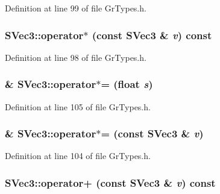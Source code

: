 Definition at line 99 of file GrTypes.h.\hypertarget{struct_s_vec3_0366aeb56a82c9455af3c1da0001c861}{
\subsubsection[{operator$\ast$}]{ SVec3::operator$\ast$ (const {\bf SVec3} \& {\em v}) const}}
\label{struct_s_vec3_0366aeb56a82c9455af3c1da0001c861}




Definition at line 98 of file GrTypes.h.\hypertarget{struct_s_vec3_eb70adcdab8bd8aa9351db18341ef6e0}{
\subsubsection[{operator$\ast$=}]{\& SVec3::operator$\ast$= (float {\em s})}}
\label{struct_s_vec3_eb70adcdab8bd8aa9351db18341ef6e0}




Definition at line 105 of file GrTypes.h.\hypertarget{struct_s_vec3_4a1d77dd549c58455c0003e1445d1ad3}{
\subsubsection[{operator$\ast$=}]{\& SVec3::operator$\ast$= (const {\bf SVec3} \& {\em v})}}
\label{struct_s_vec3_4a1d77dd549c58455c0003e1445d1ad3}




Definition at line 104 of file GrTypes.h.\hypertarget{struct_s_vec3_64c7cbcbb060d5879af8e75b5a0f8a3e}{
\subsubsection[{operator+}]{ SVec3::operator+ (const {\bf SVec3} \& {\em v}) const}}
\label{struct_s_vec3_64c7cbcbb060d5879af8e75b5a0f8a3e}




